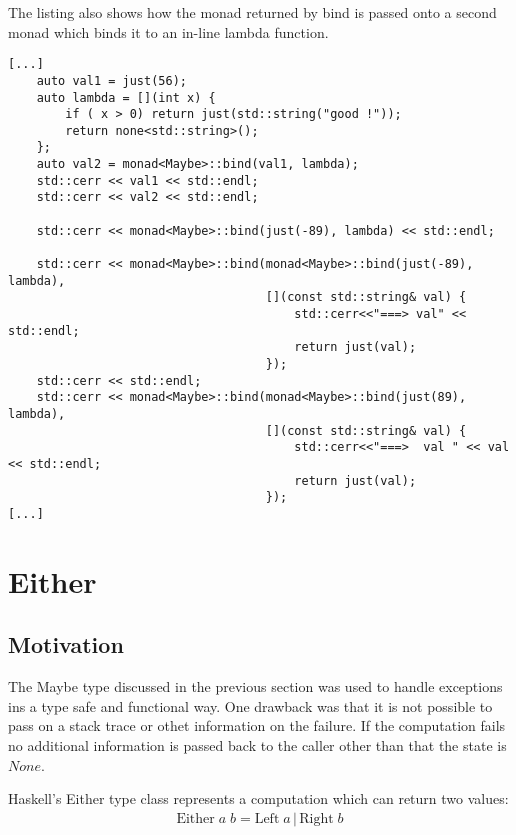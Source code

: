 \documentclass[12pt,fleqn]{article}
\begin{document}
The listing also shows how the monad returned by bind is passed onto a second monad which binds it to an in-line lambda function.

%
%
\begin{minipage}{\linewidth}
\begin{lstlisting}[caption=Maybe monad example, label=maybemonadexample]
[...]
	auto val1 = just(56);
	auto lambda = [](int x) {
		if ( x > 0) return just(std::string("good !"));
		return none<std::string>();
	};
	auto val2 = monad<Maybe>::bind(val1, lambda);
	std::cerr << val1 << std::endl;
	std::cerr << val2 << std::endl;

	std::cerr << monad<Maybe>::bind(just(-89), lambda) << std::endl;

	std::cerr << monad<Maybe>::bind(monad<Maybe>::bind(just(-89), lambda),
									[](const std::string& val) {
										std::cerr<<"===> val" << std::endl;
										return just(val);
									});
	std::cerr << std::endl;
	std::cerr << monad<Maybe>::bind(monad<Maybe>::bind(just(89), lambda),
									[](const std::string& val) {
										std::cerr<<"===>  val " << val << std::endl;
										return just(val);
									});
[...]
\end{lstlisting}
\end{minipage}
%
%
%


\section{Either}
%
%
%

\subsection{Motivation}
%
%

The Maybe type discussed in the previous section was used to handle exceptions ins a type safe and functional way.
One drawback was that it is not possible to pass on a stack trace or othet information on the failure.  
If the computation fails no additional information is passed back to the caller other than that the state is $None$.

Haskell's Either type class represents a computation which can return two values:
\begin{eqnarray*}
\mbox {Either} \; a \; b = \mbox{Left} \; a \, | \, \mbox{Right} \; b
\end{eqnarray*}
\end{document}
